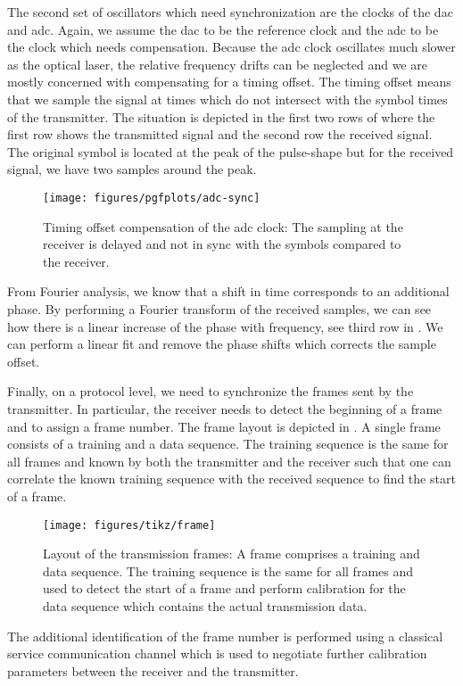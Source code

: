 The second set of oscillators which need synchronization are the clocks of the \gls{dac} and \gls{adc}.
Again, we assume the \gls{dac} to be the reference clock and the \gls{adc} to be the clock which needs compensation.
Because the \gls{adc} clock oscillates much slower as the optical laser, the relative frequency drifts can be neglected and we are mostly concerned with compensating for a timing offset.
The timing offset means that we sample the signal at times which do not intersect with the symbol times of the transmitter.
The situation is depicted in the first two rows of  where the first row shows the transmitted signal and the second row the received signal.
The original symbol is located at the peak of the pulse-shape but for the received signal, we have two samples around the peak.
\begin{figure}[htb]
	\centering
	\texttt{[image: figures/pgfplots/adc-sync]}
	\caption{Timing offset compensation of the \gls{adc} clock: The sampling at the receiver is delayed and not in sync with the symbols compared to the receiver.}\label{fig:adc_sync}
\end{figure}
From Fourier analysis, we know that a shift in time corresponds to an additional phase.
By performing a Fourier transform of the received samples, we can see how there is a linear increase of the phase with frequency, see third row in .
We can perform a linear fit and remove the phase shifts which corrects the sample offset.

Finally, on a protocol level, we need to synchronize the frames sent by the transmitter.
In particular, the receiver needs to detect the beginning of a frame and to assign a frame number.
The frame layout is depicted in .
A single frame consists of a training and a data sequence.
The training sequence is the same for all frames and known by both the transmitter and the receiver such that one can correlate the known training sequence with the received sequence to find the start of a frame.
\begin{figure}[htb]
	\centering
	\texttt{[image: figures/tikz/frame]}
	\caption{Layout of the transmission frames: A frame comprises a training and data sequence. The training sequence is the same for all frames and used to detect the start of a frame and perform calibration for the data sequence which contains the actual transmission data.}\label{fig:frame}
\end{figure}
The additional identification of the frame number is performed using a classical service communication channel which is used to negotiate further calibration parameters between the receiver and the transmitter.
